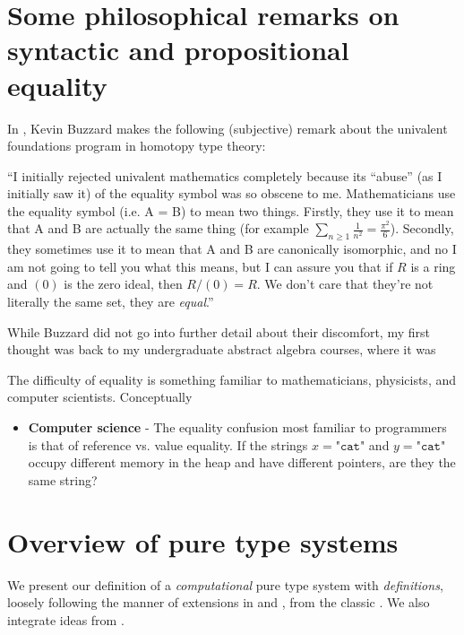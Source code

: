 \section{Some philosophical remarks on syntactic and propositional equality}

In \cite{FashionableMathematics}, Kevin Buzzard makes the following (subjective) remark about the univalent foundations program in homotopy type theory:

    ``I initially rejected univalent mathematics completely because its “abuse” (as I initially saw it) of the equality symbol was so obscene to me. Mathematicians use the equality symbol (i.e. A = B) to mean two things. Firstly, they use it to mean that A and B are actually the same thing (for example $\sum_{n\geq1}\frac{1}{n^2}=\frac{\pi^2}{6}$). Secondly, they sometimes use it to mean that A and B are canonically isomorphic, and no I am not going to tell you what this means, but I can assure you that if $R$ is a ring and $(0)$ is the zero ideal, then $R/(0)=R$. We don’t care that they’re not literally the same set, they are \emph{equal}.''

While Buzzard did not go into further detail about their discomfort, my first thought was back to my undergraduate abstract algebra courses, where it was 

The difficulty of equality is something familiar to mathematicians, physicists, and computer scientists. Conceptually 

\begin{itemize}
    \item \textbf{Computer science} - The equality confusion most familiar to programmers is that of reference vs. value equality. If the strings $x = \texttt{"cat"}$ and $y = \texttt{"cat"}$ occupy different memory in the heap and have different pointers, are they the same string? 
\end{itemize}

\section{Overview of pure type systems}

We present our definition of a \emph{computational} pure type system with \emph{definitions}, loosely following the manner of extensions in \cite{ClassicalPTS97} and \cite{PTSWithDefinitions}, from the classic \cite{BarendregtPTS1}. We also integrate ideas from \cite{RhoCalculus}.

